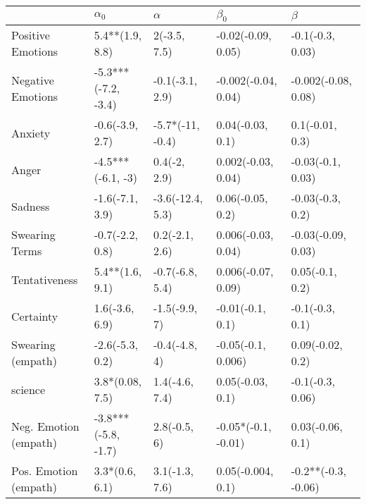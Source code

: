 \begin{tabular}{lllll}
\toprule
{} &           $\alpha_0$ &          $\alpha$ &            $\beta_0$ &              $\beta$ \\
\midrule
Positive Emotions     &      5.4**(1.9, 8.8) &      2(-3.5, 7.5) &   -0.02(-0.09, 0.05) &     -0.1(-0.3, 0.03) \\
Negative Emotions     &  -5.3***(-7.2, -3.4) &   -0.1(-3.1, 2.9) &  -0.002(-0.04, 0.04) &  -0.002(-0.08, 0.08) \\
Anxiety               &      -0.6(-3.9, 2.7) &  -5.7*(-11, -0.4) &     0.04(-0.03, 0.1) &      0.1(-0.01, 0.3) \\
Anger                 &    -4.5***(-6.1, -3) &      0.4(-2, 2.9) &   0.002(-0.03, 0.04) &    -0.03(-0.1, 0.03) \\
Sadness               &      -1.6(-7.1, 3.9) &  -3.6(-12.4, 5.3) &     0.06(-0.05, 0.2) &     -0.03(-0.3, 0.2) \\
Swearing Terms        &      -0.7(-2.2, 0.8) &    0.2(-2.1, 2.6) &   0.006(-0.03, 0.04) &   -0.03(-0.09, 0.03) \\
Tentativeness         &      5.4**(1.6, 9.1) &   -0.7(-6.8, 5.4) &   0.006(-0.07, 0.09) &      0.05(-0.1, 0.2) \\
Certainty             &       1.6(-3.6, 6.9) &     -1.5(-9.9, 7) &     -0.01(-0.1, 0.1) &      -0.1(-0.3, 0.1) \\
Swearing (empath)     &      -2.6(-5.3, 0.2) &     -0.4(-4.8, 4) &   -0.05(-0.1, 0.006) &     0.09(-0.02, 0.2) \\
science               &      3.8*(0.08, 7.5) &    1.4(-4.6, 7.4) &     0.05(-0.03, 0.1) &     -0.1(-0.3, 0.06) \\
Neg. Emotion (empath) &  -3.8***(-5.8, -1.7) &      2.8(-0.5, 6) &  -0.05*(-0.1, -0.01) &     0.03(-0.06, 0.1) \\
Pos. Emotion (empath) &       3.3*(0.6, 6.1) &    3.1(-1.3, 7.6) &    0.05(-0.004, 0.1) &  -0.2**(-0.3, -0.06) \\
\bottomrule
\end{tabular}
